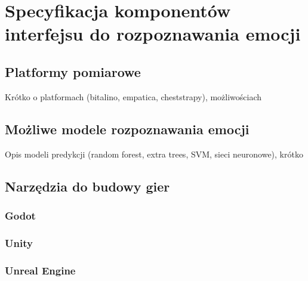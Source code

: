 \chapter{Specyfikacja komponentów interfejsu do rozpoznawania emocji}
\label{cha:specyfikacja}
\section{Platformy pomiarowe}
Krótko o platformach (bitalino, empatica, cheststrapy), możliwościach 
\section{Możliwe modele rozpoznawania emocji}
Opis modeli predykcji (random forest, extra trees, SVM, sieci neuronowe), krótko
\section{Narzędzia do budowy gier}
\subsection{Godot}
\subsection{Unity}
\subsection{Unreal Engine}